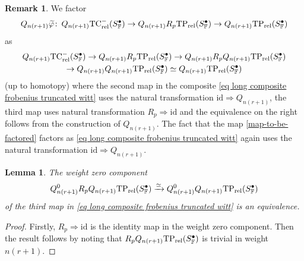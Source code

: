 \documentclass[english,10pt]{amsart}
\newcommand{\rel}{\textup{rel}}
\newcommand{\field}{\mathbb{F}}
\newtheorem{lemm}{Lemma}[section]
\theoremstyle{definition}
\newtheorem{rema}{Remark}[section]
\numberwithin{equation}{section}
\newcommand{\rntc}{\mathrm{TC}_{\rel}^{-}}
\newcommand{\rtp}{\mathrm{TP}_{\rel}}
\def\co{\colon\thinspace}
\begin{document}
\begin{rema}\label{rema factoring frobenius for truncated witt}
We factor
\begin{equation}\label{map-to-be-factored}
Q_{n(r+1)} \widetilde{\varphi} \co Q_{n(r+1)}\rntc(S_{\field}^{\bullet}) \to Q_{n(r+1)}R_p\rtp(S_{\field}^{\bullet}) \to Q_{n(r+1)}\rtp(S_{\field}^{\bullet})
\end{equation}
as 
\begin{multline}\label{eq long composite frobenius truncated witt}
Q_{n(r+1)}\rntc(S_{\field}^{\bullet}) \to Q_{n(r+1)}R_p\rtp(S_{\field}^{\bullet}) \to Q_{n(r+1)} R_p Q_{n(r+1)}\rtp(S_{\field}^{\bullet})\\ \to Q_{n(r+1)}Q_{n(r+1)}\rtp(S_{\field}^{\bullet}) \simeq Q_{n(r+1)}\rtp(S_{\field}^{\bullet})
\end{multline}
(up to homotopy) where the second map in the composite \eqref{eq long composite frobenius truncated witt} uses the natural transformation $\mathrm{id} \Rightarrow Q_{n(r+1)} $, the third map uses natural transformation $R_p \Rightarrow \mathrm{id}$ and the equivalence on the right follows from the construction of $Q_{n(r+1)}$. The fact that the map \eqref{map-to-be-factored} factors as \eqref{eq long composite frobenius truncated witt} again uses the natural transformation $\mathrm{id} \Rightarrow Q_{n(r+1)}$. 
\end{rema}



\begin{lemm}\label{lemm truncated witt a quotient is surjective}
The weight zero component
\[ Q_{n(r+1)}^0 R_p Q_{n(r+1)}\rtp(S_{\field}^{\bullet}) \xrightarrow{\simeq} Q_{n(r+1)}^0Q_{n(r+1)}\rtp(S_{\field}^{\bullet})\]
of  the third map in \eqref{eq long composite frobenius truncated witt} is an equivalence. 
\end{lemm}

\begin{proof}
Firstly, $R_p \Rightarrow \mathrm{id}$ is the identity map in the weight zero component. Then the result follows by noting that   $R_p Q_{n(r+1)}\rtp(S_{\field}^{\bullet})$ is trivial in weight $n(r+1)$.
\end{proof}
\end{document}
